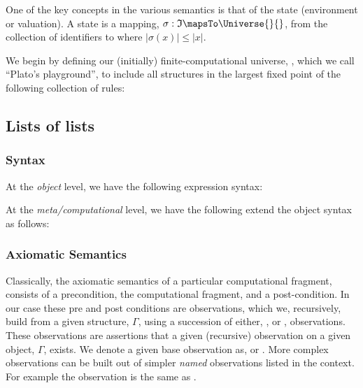 One of the key concepts in the various semantics is that of the state
(environment or valuation). A state is a mapping, $\sigma : \mathfrak{I} \mapsTo
\Universe{}{}$, from the collection of identifiers to \Universe{}{} where
$|\sigma(x)| \le |x|$.

We begin by defining our (initially) finite-computational universe,
\Universe{}{}, which we call ``Plato's playground'', to include all structures
in the largest fixed point of the following collection of rules:

\subsection{Lists of lists}

\subsubsection{Syntax}

At the \emph{object} level, we have the following expression syntax:

\begin{bnf*}\label{ch7-null-list}
\end{bnf*}

At the \emph{meta/computational} level, we have the following extend the object
syntax as follows:

\begin{bnf*}
\end{bnf*}

\subsubsection{Axiomatic Semantics}

Classically, the axiomatic semantics of a particular computational fragment,
consists of a precondition, the computational fragment, and a post-condition. In
our case these pre and post conditions are observations, which we, recursively,
build from a given structure, $\Gamma$, using a succession of either,
\car{\Gamma}, or \cdr{\Gamma}, observations. These observations are assertions
that a given (recursive) observation on a given object, $\Gamma$, exists. We
denote a given base observation as, \observation{\Gamma}{\cdot}{\car{\Gamma}} or
\observation{\Gamma}{\cdot}{\cdr{\Gamma}}. More complex observations can be
built out of simpler \emph{named} observations listed in the context. For
example the observation  is
the same as \observation{\Gamma}{\cdot}{\cdr{\car{\Gamma}}}.

